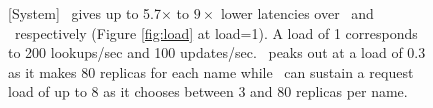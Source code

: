 \begin{figure}[ht]
\vspace{-0.15in}
\caption{[System] \auspice\ gives up to 5.7$\times$ to $9\times$ lower latencies over \staticthree\ and \codons\ respectively (Figure \ref{fig:load} at load=1). A load of 1 corresponds to 200 lookups/sec and 100 updates/sec. \replicateall\ peaks out at a load of 0.3 as it makes 80 replicas for each name while \auspice\ can sustain a request load of up to 8 as it chooses between 3 and 80 replicas per name.}
\vspace{-0.15in}
\label{fig:lookupupdate}
\end{figure}


 




